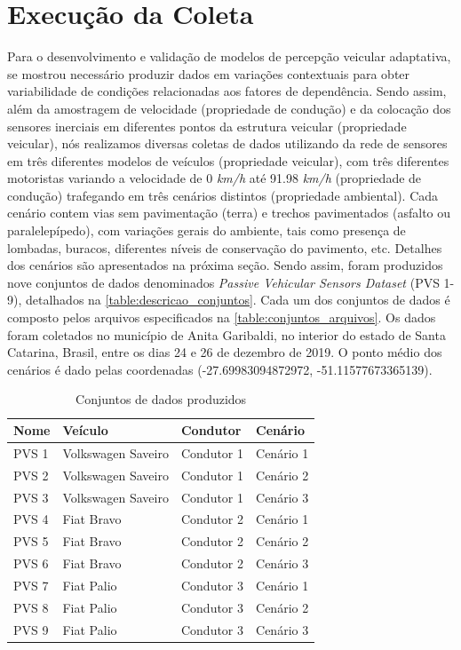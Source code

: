 \section{Execução da Coleta}

Para o desenvolvimento e validação de modelos de percepção veicular adaptativa, se mostrou necessário produzir dados em variações contextuais para obter variabilidade de condições relacionadas aos fatores de dependência. Sendo assim, além da amostragem de velocidade (propriedade de condução) e da colocação dos sensores inerciais em diferentes pontos da estrutura veicular (propriedade veicular), nós realizamos diversas coletas de dados utilizando da rede de sensores em três diferentes modelos de veículos (propriedade veicular), com três diferentes motoristas variando a velocidade de 0 \emph{km/h} até 91.98 \emph{km/h} (propriedade de condução) trafegando em três cenários distintos (propriedade ambiental). Cada cenário contem vias sem pavimentação (terra) e trechos pavimentados (asfalto ou paralelepípedo), com variações gerais do ambiente, tais como presença de lombadas, buracos, diferentes níveis de conservação do pavimento, etc. Detalhes dos cenários são apresentados na próxima seção. Sendo assim, foram produzidos nove conjuntos de dados denominados \textit{Passive Vehicular Sensors Dataset} (PVS 1-9), detalhados na \autoref{table:descricao_conjuntos}. Cada um dos conjuntos de dados é composto pelos arquivos especificados na \autoref{table:conjuntos_arquivos}. Os dados foram coletados no município de Anita Garibaldi, no interior do estado de Santa Catarina, Brasil, entre os dias 24 e 26 de dezembro de 2019. O ponto médio dos cenários é dado pelas coordenadas (-27.69983094872972, -51.11577673365139).

\begin{table}[H]
\small
\caption{Conjuntos de dados produzidos} 
\label{table:descricao_conjuntos}
\centering
\begin{tabular}{llll}
\toprule
\textbf{Nome} & \textbf{Veículo} & \textbf{Condutor} & \textbf{Cenário} \\ \midrule
PVS 1 & Volkswagen Saveiro & Condutor 1 & Cenário 1 \\ \midrule
PVS 2 & Volkswagen Saveiro & Condutor 1 & Cenário 2 \\ \midrule
PVS 3 & Volkswagen Saveiro & Condutor 1 & Cenário 3 \\ \midrule
PVS 4 & Fiat Bravo & Condutor 2 & Cenário 1 \\ \midrule
PVS 5 & Fiat Bravo & Condutor 2 & Cenário 2 \\ \midrule
PVS 6 & Fiat Bravo & Condutor 2 & Cenário 3 \\ \midrule
PVS 7 & Fiat Palio & Condutor 3 & Cenário 1 \\ \midrule
PVS 8 & Fiat Palio & Condutor 3 & Cenário 2 \\ \midrule
PVS 9 & Fiat Palio & Condutor 3 & Cenário 3 \\ \bottomrule
\end{tabular}
\end{table}

